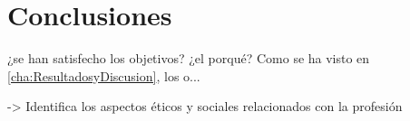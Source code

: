 
\chapter{Conclusiones}
\label{cha:Conclusiones}

    ¿se han satisfecho los objetivos? ¿el porqué? Como se ha visto en \ref{cha:ResultadosyDiscusion}, los o...

    -> Identifica los aspectos éticos y sociales relacionados con la profesión


